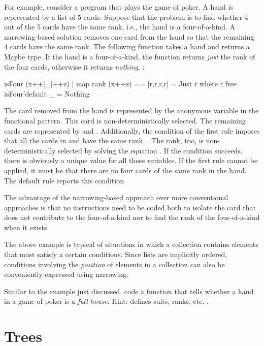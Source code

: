 For example, consider a program that plays the game of poker.
A hand is represented by a list of 5 cards.
Suppose that the problem is to find whether 4 out of the 5 cards
have the same rank, i.e., the hand is a four-of-a-kind.
A narrowing-based solution removes one card from the hand
so that the remaining 4 cards have the same rank.
The following function takes a hand and returns a Maybe type.
If the hand is a four-of-a-kind, the function returns \emph{just}
the rank of the four cards, otherwise it returns \emph{nothing}.
:
%
\begin{curry}
isFour (x++[_]++z) | map rank (x++z) == [r,r,r,r] = Just r where r free
isFour'default _ = Nothing
\end{curry}
%
The card removed from the hand is represented by the anonymous
variable in the functional pattern.
This card is non-deterministically selected.
The remaining cards are represented by  and .
Additionally, the condition of the first rule imposes that
all the cards in  and 
have the same rank, .
The rank, too, is non-deterministically selected by solving
the equation .
If the condition succeeds, there is obviously a unique
value for all these variables.
If the first rule cannot be applied, it must be that
there are no four cards of the same rank in the hand.
The default rule reports this condition

The advantage of the narrowing-based approach
over more conventional approaches is that no instructions need to
be coded both to isolate the card that does not contribute to
the four-of-a-kind nor to find the rank of the four-of-a-kind
when it exists.

The above example is typical of situations in which a collection
contains elements that must satisfy a certain conditions.
Since lists are implicitly ordered, conditions involving
the \emph{position} of elements in a collection can also be
conveniently expressed using narrowing.

\begin{exercise}
Similar to the example just discussed, code a function
that tells whether a hand in a game of poker is a
\emph{full house}.
Hint: 
defines suits, ranks, etc.
.
\end{exercise}

\section{Trees}

